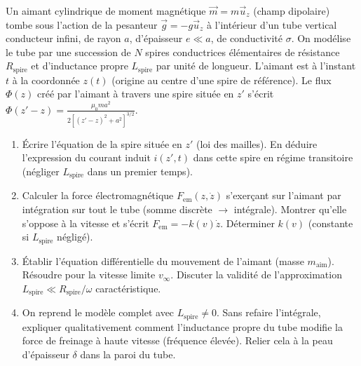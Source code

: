 \documentclass[11pt]{article}
\begin{document}
\begin{exercice}
Un aimant cylindrique de moment magnétique $\vec{m} = m\vec{u}_z$ (champ dipolaire) tombe sous l'action de la pesanteur $\vec{g} = -g\vec{u}_z$ à l'intérieur d'un tube vertical conducteur infini, de rayon $a$, d'épaisseur $e \ll a$, de conductivité $\sigma$. On modélise le tube par une succession de $N$ spires conductrices élémentaires de résistance $R_{\text{spire}}$ et d'inductance propre $L_{\text{spire}}$ par unité de longueur. L'aimant est à l'instant $t$ à la coordonnée $z(t)$ (origine au centre d'une spire de référence). Le flux $\Phi(z)$ créé par l'aimant à travers une spire située en $z'$ s'écrit $\Phi(z'-z) = \frac{\mu_0 m a^2}{2[(z'-z)^2+a^2]^{3/2}}$.
\begin{enumerate}
    \item Écrire l'équation de la spire située en $z'$ (loi des mailles). En déduire l'expression du courant induit $i(z',t)$ dans cette spire en régime transitoire (négliger $L_{\text{spire}}$ dans un premier temps).
    \item Calculer la force électromagnétique $F_{\text{em}}(z, \dot{z})$ s'exerçant sur l'aimant par intégration sur tout le tube (somme discrète $\to$ intégrale). Montrer qu'elle s'oppose à la vitesse et s'écrit $F_{\text{em}} = -k(v) \dot{z}$. Déterminer $k(v)$ (constante si $L_{\text{spire}}$ négligé).
    \item Établir l'équation différentielle du mouvement de l'aimant (masse $m_{\text{aim}}$). Résoudre pour la vitesse limite $v_{\infty}$. Discuter la validité de l'approximation $L_{\text{spire}} \ll R_{\text{spire}}/\omega$ caractéristique.
    \item On reprend le modèle complet avec $L_{\text{spire}} \neq 0$. Sans refaire l'intégrale, expliquer qualitativement comment l'inductance propre du tube modifie la force de freinage à haute vitesse (fréquence élevée). Relier cela à la peau d'épaisseur $\delta$ dans la paroi du tube.
\end{enumerate}
\end{exercice}
\end{document}
